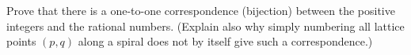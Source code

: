 Prove that there is a one-to-one correspondence (bijection) between the positive integers and the rational numbers. (Explain also why simply numbering all lattice points $(p,q)$ along a spiral does not by itself give such a correspondence.)
